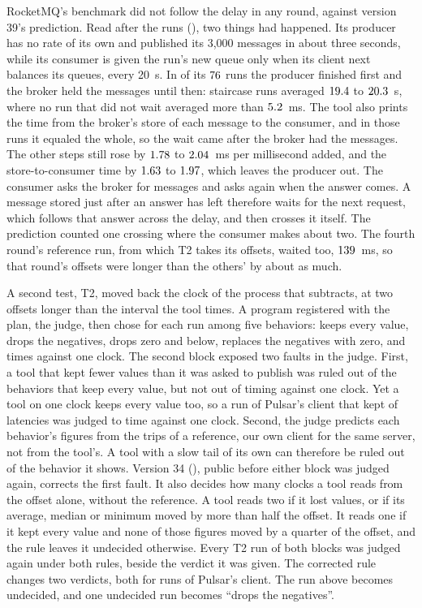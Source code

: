 \documentclass[10pt,journal,onecolumn]{IEEEtran}
\begin{document}
RocketMQ's benchmark did not follow the delay in any round, against version 39's prediction.
Read after the runs (), two things had happened. Its producer
has no rate of its own and published its 3,000 messages in about three seconds, while its consumer is
given the run's new queue only when its client next balances its queues, every 20~s. In
\toolsRocketWaitedWord{} of its $76$ runs the producer finished first and the
broker held the messages until then: \toolsRocketLongWaitsWord{} staircase runs averaged
$19.4$ to $20.3$~s, where no run that did not wait averaged
more than $5.2$~ms. The tool also prints the time from the broker's store of each
message to the consumer, and in those runs it equaled the whole, so the wait came after the broker
had the messages. The other steps still rose by $1.78$ to $2.04$~ms
per millisecond added, and the store-to-consumer time by $1.63$ to
$1.97$, which leaves the producer out. The consumer asks the broker for messages
and asks again when the answer comes. A message stored just after an answer has left therefore
waits for the next request, which follows that answer across the delay, and then crosses it
itself. The prediction counted one crossing where the consumer makes about two. The fourth round's
reference run, from which T2 takes its offsets, waited too, $139$~ms, so that round's
offsets were longer than the others' by about as much.

A second test, T2, moved back the clock of the process that subtracts, at two offsets longer than
the interval the tool times. A program registered with the plan, the judge, then chose for each
run among five behaviors: keeps every value, drops the negatives, drops zero and below, replaces
the negatives with zero, and times against one clock. The second block exposed two faults in the
judge. First, a tool that kept fewer values than it was asked to publish was ruled out of the
behaviors that keep every value, but not out of timing against one clock. Yet a tool on one clock
keeps every value too, so a run of Pulsar's client that kept \toolsPulsarOneClockKept{} of
\toolsAskedToSend{} latencies was judged to time against one clock. Second, the judge predicts
each behavior's figures from the trips of a reference, our own client for the same server, not
from the tool's. A tool with a slow tail of its own can therefore be ruled out of the behavior it
shows. Version 34 (), public before either block was judged
again, corrects the first fault. It also decides how many clocks a tool reads from the offset
alone, without the reference. A tool reads two if it lost values, or if its average, median or
minimum moved by more than half the offset. It reads one if it kept every value and none of those
figures moved by a quarter of the offset, and the rule leaves it undecided otherwise. Every T2 run
of both blocks was judged again under both rules, beside the verdict it was given. The corrected
rule changes two verdicts, both for runs of
Pulsar's client. The run above becomes undecided, and one undecided run becomes ``drops the
negatives''.
\end{document}
